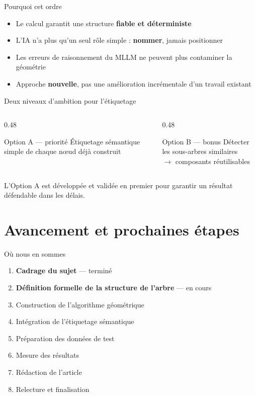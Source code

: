 \documentclass[11pt,aspectratio=169]{beamer}
\begin{document}
\begin{frame}{Pourquoi cet ordre}
  \begin{itemize}
    \item Le calcul garantit une structure \textbf{fiable et déterministe}
    \item L'IA n'a plus qu'un seul rôle simple : \textbf{nommer}, jamais positionner
    \item Les erreurs de raisonnement du MLLM ne peuvent plus contaminer la géométrie
    \item Approche \textbf{nouvelle}, pas une amélioration incrémentale d'un travail existant
  \end{itemize}
\end{frame}

\begin{frame}{Deux niveaux d'ambition pour l'étiquetage}
  \begin{columns}[T,onlytextwidth]
    \begin{column}{0.48\textwidth}
      \begin{block}{Option A --- priorité}
        Étiquetage sémantique simple de chaque nœud déjà construit
      \end{block}
    \end{column}
    \begin{column}{0.48\textwidth}
      \begin{alertblock}{Option B --- bonus}
        Détecter les sous-arbres similaires \\ $\rightarrow$ composants réutilisables
      \end{alertblock}
    \end{column}
  \end{columns}
  \vspace{6mm}
  \small \centering L'Option A est développée et validée en premier pour garantir un résultat défendable dans les délais.
\end{frame}

\section{Avancement et prochaines étapes}

\begin{frame}{Où nous en sommes}
  \begin{enumerate}
    \item \textcolor{mathblue}{\textbf{Cadrage du sujet}} --- terminé \checkmark
    \item \alert{\textbf{Définition formelle de la structure de l'arbre}} --- en cours
    \item Construction de l'algorithme géométrique
    \item Intégration de l'étiquetage sémantique
    \item Préparation des données de test
    \item Mesure des résultats
    \item Rédaction de l'article
    \item Relecture et finalisation
  \end{enumerate}
\end{frame}
\end{document}
